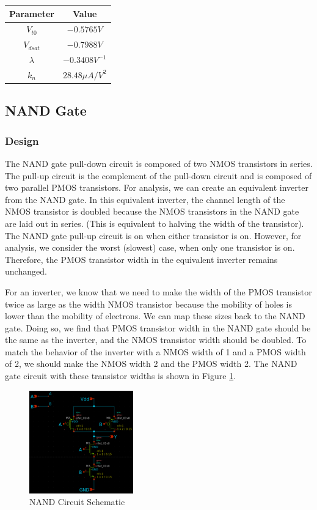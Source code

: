 \documentclass[fleqn]{article}
\begin{document}
	\begin{center}
	\begin{tabular}{| c | c |}
		\hline
		Parameter & Value \\
		\hline	
		$V_{t0}$ & $-0.5765 V$\\
		\hline	
		$V_{dsat}$ & $-0.7988 V$\\
		\hline	
		$\lambda$ & $-0.3408 V^{-1}$\\
		\hline			
		$k_n$ & $28.48 {\mu}A/V^2$ \\
		\hline
	\end{tabular}
	\end{center}
	
	\subsection{NAND Gate}
	
	\subsubsection{Design}
	
	The NAND gate pull-down circuit is composed of two NMOS transistors in series. The pull-up circuit is the complement of the pull-down circuit and is composed of two parallel PMOS transistors. For analysis, we can create an equivalent inverter from the NAND gate. In this equivalent inverter, the channel length of the NMOS transistor is doubled because the NMOS transistors in the NAND gate are laid out in series. (This is equivalent to halving the width of the transistor). The NAND gate pull-up circuit is on when either transistor is on. However, for analysis, we consider the worst (slowest) case, when only one transistor is on. Therefore, the PMOS transistor width in the equivalent inverter remains unchanged.
	
	For an inverter, we know that we need to make the width of the PMOS transistor twice as large as the width NMOS transistor because the mobility of holes is lower than the mobility of electrons. We can map these sizes back to the NAND gate. Doing so, we find that PMOS transistor width in the NAND gate should be the same as the inverter, and the NMOS transistor width should be doubled. To match the behavior of the inverter with a NMOS width of 1 and a PMOS width of 2, we should make the NMOS width 2 and the PMOS width 2. The NAND gate circuit with these transistor widths is shown in Figure \ref{fig::nand_schematic}.
	
	\begin{figure}[H]
		\centerline{\includegraphics[width=0.4\textwidth]{nand_schematic.png}}
		\caption{NAND Circuit Schematic}
		\label{fig::nand_schematic}
	\end{figure}
\end{document}
